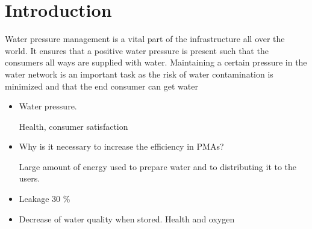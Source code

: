 \chapter{Introduction}

Water pressure management is a vital part of the infrastructure all over the world. It ensures that a positive water pressure is present such that the consumers all ways are supplied with water. Maintaining a certain pressure in the water network is an important task as the risk of water contamination is minimized\cite{national2005public} and that the end consumer can get water 
 
\begin{itemize}
\item Water pressure. 

Health, consumer satisfaction
\item Why is it necessary to increase the efficiency in PMAs?

Large amount of energy used to prepare water and to distributing it to the users. 
\item Leakage 30 \%
\item Decrease of water quality when stored.
Health and oxygen 
\end{itemize}



